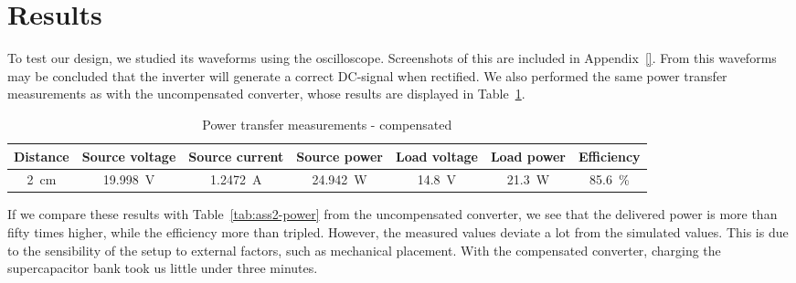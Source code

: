 \documentclass[11pt,titlepage]{report}
\begin{document}
\section*{Results}
To test our design, we studied its waveforms using the oscilloscope. Screenshots of this are included in Appendix~\ref{}. 
From this waveforms may be concluded that the inverter will generate a correct DC-signal when rectified.
We also performed the same power transfer measurements as with the uncompensated converter, whose results are displayed in Table~\ref{tab:ass3-power}.

\begin{table}[H]
	\centering
	\caption{Power transfer measurements - compensated}
	\label{tab:ass3-power}
	\begin{tabular}{c c c c c c c}
		\hline\hline
		Distance & Source voltage & Source current & Source power & Load voltage & Load power & Efficiency \\
		\hline
		\SI{2}{cm} & \SI{19.998}{V} & \SI{1.2472}{A} & \SI{24.942}{W} & \SI{14.8}{V} & \SI{21.3}{W} & \SI{85.6}{\percent} \\
		\hline
		\end{tabular}
\end{table}

If we compare these results with Table~\ref{tab:ass2-power} from the uncompensated converter, we see that the delivered power is more than fifty times higher, while the efficiency more than tripled. However, the measured values deviate a lot from the simulated values. This is due to the sensibility of the setup to external factors, such as mechanical placement. With the compensated converter, charging the supercapacitor bank took us little under three minutes.
\end{document}
